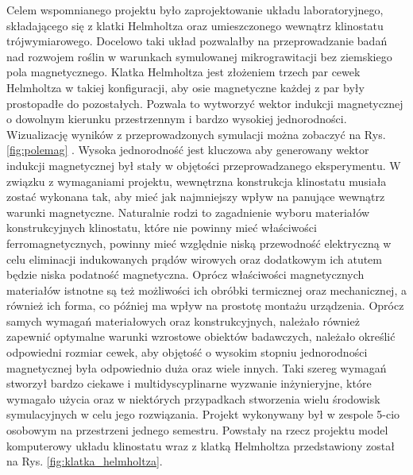 Celem wspomnianego projektu było zaprojektowanie układu laboratoryjnego, składającego się z
 klatki Helmholtza oraz umieszczonego wewnątrz klinostatu trójwymiarowego. Docelowo taki układ
  pozwalałby na przeprowadzanie badań nad rozwojem roślin w warunkach symulowanej
   mikrograwitacji bez ziemskiego pola magnetycznego. Klatka Helmholtza jest złożeniem trzech
    par cewek Helmholtza \linebreak w takiej konfiguracji, aby osie magnetyczne każdej z par były
     prostopadłe do pozostałych. Pozwala to wytworzyć wektor indukcji magnetycznej o dowolnym
      kierunku przestrzennym i bardzo wysokiej jednorodności. Wizualizację wyników \linebreak z przeprowadzonych symulacji można zobaczyć na Rys. \ref{fig:polemag} . Wysoka jednorodność jest kluczowa
       aby generowany wektor indukcji magnetycznej był stały \linebreak w objętości przeprowadzanego
        eksperymentu. W związku z wymaganiami projektu, wewnętrzna konstrukcja klinostatu
         musiała zostać wykonana tak, aby mieć jak najmniejszy wpływ na panujące wewnątrz
          warunki magnetyczne. Naturalnie rodzi to zagadnienie wyboru materiałów konstrukcyjnych
           klinostatu, które nie powinny mieć właściwości ferromagnetycznych, powinny mieć
            względnie niską przewodność elektryczną w celu eliminacji indukowanych prądów
             wirowych oraz dodatkowym ich atutem będzie niska podatność magnetyczna. Oprócz
              właściwości magnetycznych materiałów istnotne są też możliwości ich obróbki
               termicznej oraz mechanicznej, a również ich forma, co później ma wpływ na
                prostotę montażu urządzenia. Oprócz samych wymagań materiałowych oraz
                 konstrukcyjnych, należało również zapewnić optymalne warunki wzrostowe obiektów
                  badawczych, należało określić odpowiedni rozmiar cewek, aby objętość o wysokim
                   stopniu jednorodności magnetycznej była odpowiednio duża oraz wiele innych.
                    Taki szereg wymagań stworzył bardzo ciekawe i multidyscyplinarne wyzwanie
                     inżynieryjne, które wymagało użycia oraz w niektórych przypadkach
                      stworzenia wielu środowisk symulacyjnych \linebreak w celu jego rozwiązania. Projekt
                       wykonywany był w zespole 5-cio osobowym \linebreak na przestrzeni jednego semestru.
                        Powstały na rzecz projektu model komputerowy układu klinostatu wraz z
                         klatką Helmholtza przedstawiony został na Rys.
                          \ref{fig:klatka_helmholtza}.
                          
